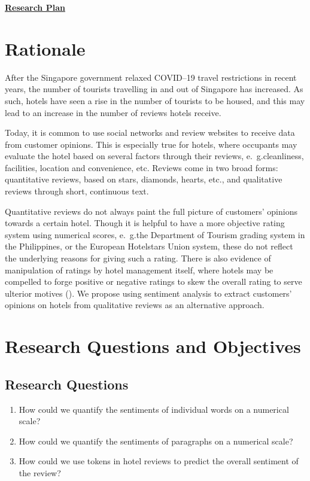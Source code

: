 \documentclass[
	fontsize=12pt,
	paper=a4,
	bibliography=totocnumbered, 
]{scrartcl}
\newcommand{\eg}{e.~g.\space}
\begin{document}
\pagestyle{scrheadings}
\onehalfspacing

{
	\noindent
	\LARGE\textbf{\underline{Research Plan}}
}

\section{Rationale}

After the Singapore government relaxed COVID--19 travel restrictions in recent years,
the number of tourists travelling in and out of Singapore has increased.
As such, hotels have seen a rise in the number of tourists to be housed,
and this may lead to an increase in the number of reviews hotels receive.

Today, it is common to use social networks and review websites
to receive data from customer opinions. This is especially true for hotels,
where occupants may evaluate the hotel based on several factors through their
reviews, \eg cleanliness, facilities, location and convenience, etc.
Reviews come in two broad forms: quantitative reviews, based on stars, diamonds, hearts, etc., and
qualitative reviews through short, continuous text.

Quantitative reviews do not always paint the full picture of customers'
opinions towards a certain hotel. Though it is helpful to have a more
objective rating system using numerical scores, \eg the Department of Tourism grading system in
the Philippines, or the European Hotelstars Union system,
these do not reflect the underlying reasons for giving such a rating.
There is also evidence of manipulation of ratings by hotel management itself, where hotels may be
compelled to forge positive or negative ratings to skew the overall rating to serve ulterior motives (\cite{tripadvisor}).
We propose using sentiment analysis to extract customers' opinions on hotels from qualitative reviews as an
alternative approach.

\section{Research Questions and Objectives}

\subsection{Research Questions}
\begin{enumerate}
	\item How could we quantify the sentiments of individual words on a numerical scale?
	\item How could we quantify the sentiments of paragraphs on a numerical scale?
	\item How could we use tokens in hotel reviews to predict the overall sentiment of the review?
\end{enumerate}
\end{document}
